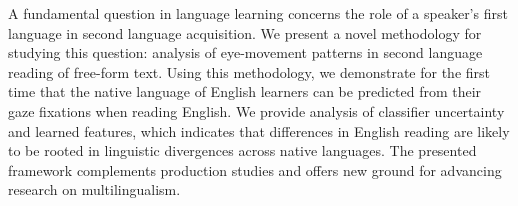 A fundamental question in language learning concerns the role of a speaker's first language in second language acquisition. We present a novel methodology for studying this question: analysis of eye-movement patterns in second language reading of free-form text. Using this methodology, we demonstrate for the first time that the native language of English learners can be predicted from their gaze fixations when reading English. We provide analysis of classifier uncertainty and learned features, which indicates that differences in English reading are likely to be rooted in linguistic divergences across native languages. The presented framework complements production studies and offers new ground for advancing research on multilingualism.
